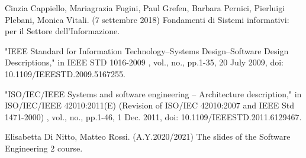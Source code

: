 \documentclass[a4paper,12pt]{report}
\begin{document}
\begin{thebibliography}{9}

Cinzia Cappiello, Mariagrazia Fugini, Paul Grefen, Barbara Pernici, Pierluigi Plebani, Monica Vitali. (7 settembre 2018)  Fondamenti di Sistemi informativi: per il Settore dell'Informazione.

"IEEE Standard for Information Technology--Systems Design--Software Design Descriptions," in IEEE STD 1016-2009 , vol., no., pp.1-35, 20 July 2009, doi: 10.1109/IEEESTD.2009.5167255.

"ISO/IEC/IEEE Systems and software engineering -- Architecture description," in ISO/IEC/IEEE 42010:2011(E) (Revision of ISO/IEC 42010:2007 and IEEE Std 1471-2000) , vol., no., pp.1-46, 1 Dec.
2011, doi: 10.1109/IEEESTD.2011.6129467.

Elisabetta Di Nitto, Matteo Rossi. (A.Y.2020/2021) The slides of the Software Engineering 2 course.

\end{thebibliography}
\end{document}

